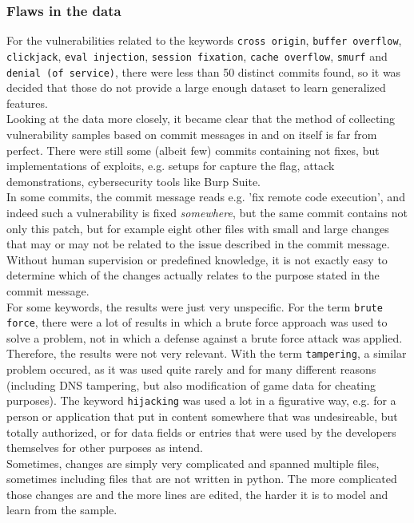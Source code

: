\documentclass[
a4paper,
pagesize,
pdftex,
12pt,
twoside, %
BCOR=5mm, %
ngerman,
fleqn,
final,
]{scrartcl}
\begin{document}
	\subsubsection{Flaws in the data}
	For the vulnerabilities related to the keywords \texttt{cross origin}, \texttt{buffer overflow}, \texttt{clickjack}, \texttt{eval injection}, \texttt{session fixation}, \texttt{cache overflow}, \texttt{smurf} and \texttt{denial (of service)}, there were less than 50 distinct commits found, so it was decided that those do not provide a large enough dataset to learn generalized features. \\
	Looking at the data more closely, it became clear that the method of collecting vulnerability samples based on commit messages in and on itself is far from perfect. There were still some (albeit few) commits containing not fixes, but implementations of exploits, e.g. setups for capture the flag, attack demonstrations, cybersecurity tools like Burp Suite.\\
	In some commits, the commit message reads e.g. 'fix remote code execution', and indeed such a vulnerability is fixed \textit{somewhere}, but the same commit contains not only this patch, but for example eight other files with small and large changes that may or may not be related to the issue described in the commit message. Without human supervision or predefined knowledge, it is not exactly easy to determine which of the changes actually relates to the purpose stated in the commit message.\\
	For some keywords, the results were just very unspecific. For the term \texttt{brute force}, there were a lot of results in which a brute force approach was used to solve a problem, not in which a defense against a brute force attack was applied. Therefore, the results were not very relevant. With the term \texttt{tampering}, a similar problem occured, as it was used quite rarely and for many different reasons (including DNS tampering, but also modification of game data for cheating purposes). The keyword \texttt{hijacking} was used a lot in a figurative way, e.g. for a person or application that put in content somewhere that was undesireable, but totally authorized, or for data fields or entries that were used by the developers themselves for other purposes as intend.\\
	Sometimes, changes are simply very complicated and spanned multiple files, sometimes including files that are not written in python. The more complicated those changes are and the more lines are edited, the harder it is to model and learn from the sample.\\
\end{document}
